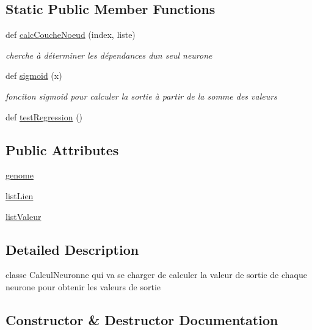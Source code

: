 \subsection*{Static Public Member Functions}
\begin{DoxyCompactItemize}
\item 
def \hyperlink{classsrc_1_1_i_a_1_1calculneurone_1_1_calcul_neurone_a099b391595178f8212b417467aa066a9}{calc\+Couche\+Noeud} (index, liste)
\begin{DoxyCompactList}\small\item\em cherche à déterminer les dépendances d\textquotesingle{}un seul neurone \end{DoxyCompactList}\item 
def \hyperlink{classsrc_1_1_i_a_1_1calculneurone_1_1_calcul_neurone_a85f9c2a232514510494df22fad8076f3}{sigmoid} (x)
\begin{DoxyCompactList}\small\item\em fonciton sigmoid pour calculer la sortie à partir de la somme des valeurs \end{DoxyCompactList}\item 
def \hyperlink{classsrc_1_1_i_a_1_1calculneurone_1_1_calcul_neurone_a06e27efe9cfd0bd879634946685299b5}{test\+Regression} ()
\end{DoxyCompactItemize}
\subsection*{Public Attributes}
\begin{DoxyCompactItemize}
\item 
\hyperlink{classsrc_1_1_i_a_1_1calculneurone_1_1_calcul_neurone_a72f88c170dedc7b9fff3200986e5dafc}{genome}
\item 
\hyperlink{classsrc_1_1_i_a_1_1calculneurone_1_1_calcul_neurone_a47ce8bc94af0536f22b9a55c7bf874d2}{list\+Lien}
\item 
\hyperlink{classsrc_1_1_i_a_1_1calculneurone_1_1_calcul_neurone_a4a217721543355649c6f25bbc50b6800}{list\+Valeur}
\end{DoxyCompactItemize}


\subsection{Detailed Description}
classe Calcul\+Neuronne qui va se charger de calculer la valeur de sortie de chaque neurone pour obtenir les valeurs de sortie 

\subsection{Constructor \& Destructor Documentation}
\mbox{\label{classsrc_1_1_i_a_1_1calculneurone_1_1_calcul_neurone_afe5ce9166d3419eb900db1d3a3801ba7}} 
